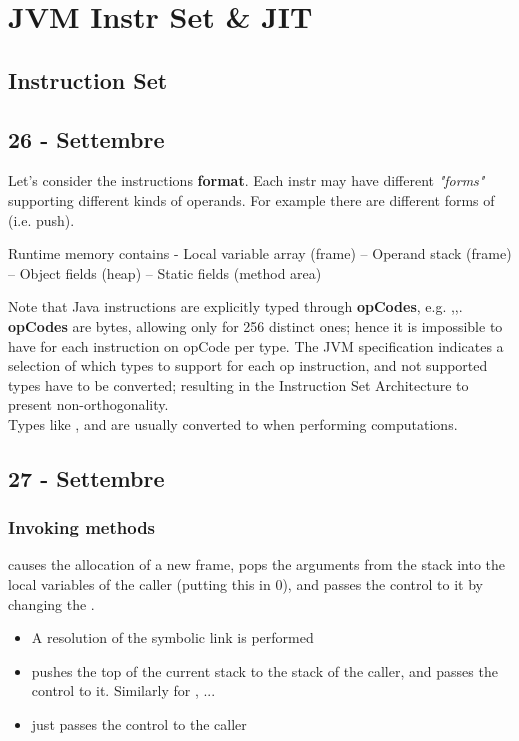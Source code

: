 \chapter{JVM Instr Set \& JIT}
\section{Instruction Set}
\section*{26 - Settembre}


Let's consider the instructions \textbf{format}.
Each instr may have different \textit{"forms"} supporting different kinds of operands.
For example there are different forms of  (i.e. push).

Runtime memory contains
- Local variable array (frame)
– Operand stack (frame)
– Object fields (heap)
– Static fields (method area)

Note that Java instructions are explicitly typed through \textbf{opCodes}, e.g. ,,.\\
\textbf{opCodes} are bytes, allowing only for 256 distinct ones;
hence it is impossible to have for each instruction on opCode per type.
The JVM specification indicates a selection of which types to support for each op instruction, and not supported types have to be converted; resulting in the Instruction Set Architecture to present non-orthogonality.\\
Types like ,  and  are usually converted to  when performing computations.

\section*{27 - Settembre}

\subsection{Invoking methods}
 causes the allocation of a new frame, pops the arguments from the stack into the local variables of the caller (putting this in 0),
and passes the control to it by changing the .
\begin{itemize}
    \item A resolution of the symbolic link is performed
    \item {} pushes the top of the current stack to the stack of the caller, and passes the control to it. Similarly for ,  ...
    \item {} just passes the control to the caller
\end{itemize}

